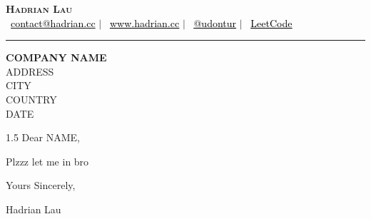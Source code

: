 \documentclass[a4paper,11pt]{article}
\begin{document}
\begin{center}
  \textbf{\Huge \scshape \color{accentgreen} Hadrian Lau} \\ \vspace{4pt}
  \small
  \faEnvelope~\href{mailto:contact@hadrian.cc}{\textcolor{black}{contact@hadrian.cc}} $|$
  \faGlobe~\href{https://hadrian.cc}{\textcolor{black}{\underline{www.hadrian.cc}}} $|$
  \faGithub~\href{https://github.com/udontur}{\textcolor{black}{\underline{@udontur}}} $|$
  \faLaptopCode~\href{https://leetcode.com/udontur}{\textcolor{black}{\underline{LeetCode}}}
\end{center}

\vspace{2pt}
{\color{accentgreen}\rule{\textwidth}{2.5pt}}
\vspace{6pt}

\begin{flushright}
  \textbf{\large COMPANY NAME} \\
  \small ADDRESS \\
  \small CITY \\
  \small COUNTRY \\[4pt]
  \small DATE
\end{flushright}

\vspace{4pt}

\begin{setstretch}{1.5}
Dear NAME,

\vspace{4pt}

Plzzz let me in bro

\vspace{16pt}

Yours Sincerely,

Hadrian Lau
\end{setstretch}

\end{document}
